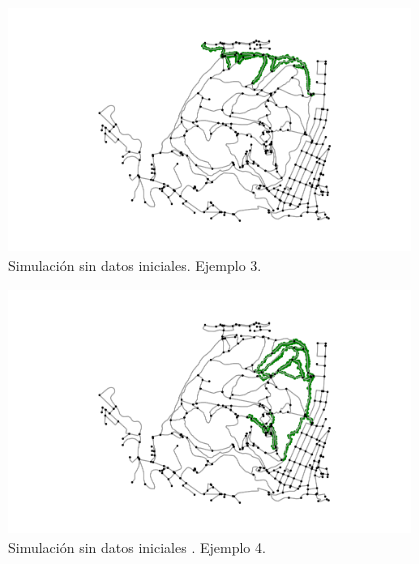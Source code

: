 \begin{figure}[h]
\begin{center}
\includegraphics[width=0.95\textwidth]{./Imagenes/empty-simulation/track3.png}
\caption{Simulación sin datos iniciales. Ejemplo 3.}
\end{center}
\label{figure:Simulation3}
\end{figure}

\begin{figure}[h]
\begin{center}
\includegraphics[width=0.95\textwidth]{./Imagenes/empty-simulation/track4.png}
\caption{Simulación sin datos iniciales . Ejemplo 4.}
\end{center}
\label{figure:Simulation4}
\end{figure}